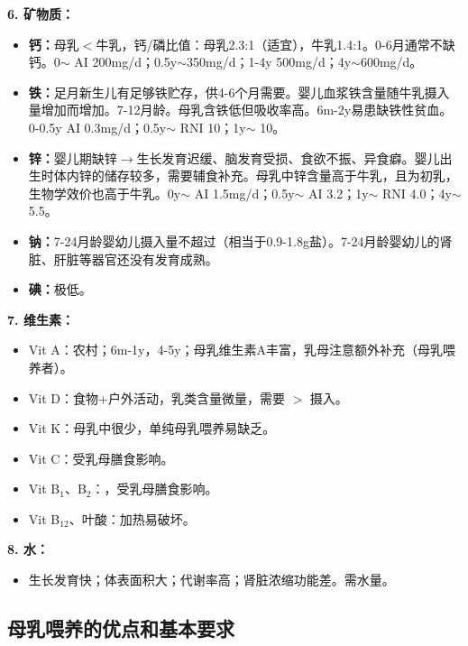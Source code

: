 \begin{keybox}
\textbf{6. 矿物质：}
\begin{itemize}[leftmargin=*]
    \item \textbf{钙：}母乳$<$牛乳，钙/磷比值：母乳2.3:1（适宜），牛乳1.4:1。0-6月通常不缺钙。0$\sim$ AI 200mg/d；0.5y$\sim$350mg/d；1-4y 500mg/d；4y$\sim$600mg/d。
    \item \textbf{铁：}足月新生儿有足够铁贮存，供4-6个月需要。婴儿血浆铁含量随牛乳摄入量增加而增加。7-12月龄。母乳含铁低但吸收率高。6m-2y易患缺铁性贫血。0-0.5y AI 0.3mg/d；0.5y$\sim$ RNI 10；1y$\sim$ 10。
    \item \textbf{锌：}婴儿期缺锌$\rightarrow$生长发育迟缓、脑发育受损、食欲不振、异食癖。婴儿出生时体内锌的储存较多，需要辅食补充。母乳中锌含量高于牛乳，且为初乳，生物学效价也高于牛乳。0y$\sim$ AI 1.5mg/d；0.5y$\sim$ AI 3.2；1y$\sim$ RNI 4.0；4y$\sim$ 5.5。
    \item \textbf{钠：}7-24月龄婴幼儿摄入量不超过（相当于0.9-1.8g盐）。7-24月龄婴幼儿的肾脏、肝脏等器官还没有发育成熟。
    \item \textbf{碘：}极低。
\end{itemize}

\textbf{7. 维生素：}
\begin{itemize}[leftmargin=*]
    \item Vit A：农村；6m-1y，4-5y；母乳维生素A丰富，乳母注意额外补充（母乳喂养者）。
    \item Vit D：食物+户外活动，乳类含量微量，需要 $>$ 摄入。
    \item Vit K：母乳中很少，单纯母乳喂养易缺乏。
    \item Vit C：受乳母膳食影响。
    \item Vit B$_{1}$、B$_{2}$：，受乳母膳食影响。
    \item Vit B$_{12}$、叶酸：加热易破坏。
\end{itemize}

\textbf{8. 水：}
\begin{itemize}[leftmargin=*]
    \item 生长发育快；体表面积大；代谢率高；肾脏浓缩功能差。需水量。
\end{itemize}
\end{keybox}

\subsection{母乳喂养的优点和基本要求}

